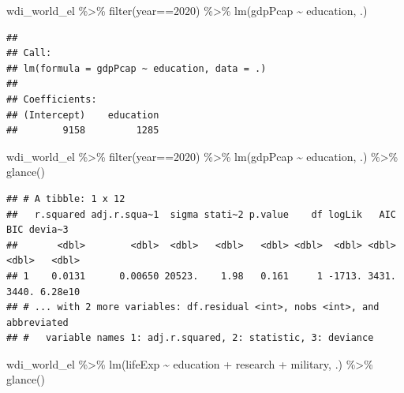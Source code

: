 \documentclass[
]{article}
\newenvironment{Shaded}{\begin{snugshade}}{\end{snugshade}}
\newcommand{\DecValTok}[1]{\textcolor[rgb]{0.00,0.00,0.81}{#1}}
\newcommand{\FunctionTok}[1]{\textcolor[rgb]{0.00,0.00,0.00}{#1}}
\newcommand{\NormalTok}[1]{#1}
\newcommand{\SpecialCharTok}[1]{\textcolor[rgb]{0.00,0.00,0.00}{#1}}
\begin{document}
\begin{Shaded}
\begin{Highlighting}[]
\NormalTok{wdi\_world\_el }\SpecialCharTok{\%\textgreater{}\%} \FunctionTok{filter}\NormalTok{(year}\SpecialCharTok{==}\DecValTok{2020}\NormalTok{) }\SpecialCharTok{\%\textgreater{}\%} \FunctionTok{lm}\NormalTok{(gdpPcap }\SpecialCharTok{\textasciitilde{}}\NormalTok{ education, .)}
\end{Highlighting}
\end{Shaded}

\begin{verbatim}
## 
## Call:
## lm(formula = gdpPcap ~ education, data = .)
## 
## Coefficients:
## (Intercept)    education  
##        9158         1285
\end{verbatim}

\begin{Shaded}
\begin{Highlighting}[]
\NormalTok{wdi\_world\_el }\SpecialCharTok{\%\textgreater{}\%} \FunctionTok{filter}\NormalTok{(year}\SpecialCharTok{==}\DecValTok{2020}\NormalTok{) }\SpecialCharTok{\%\textgreater{}\%} \FunctionTok{lm}\NormalTok{(gdpPcap }\SpecialCharTok{\textasciitilde{}}\NormalTok{ education, .) }\SpecialCharTok{\%\textgreater{}\%} \FunctionTok{glance}\NormalTok{()}
\end{Highlighting}
\end{Shaded}

\begin{verbatim}
## # A tibble: 1 x 12
##   r.squared adj.r.squa~1  sigma stati~2 p.value    df logLik   AIC   BIC devia~3
##       <dbl>        <dbl>  <dbl>   <dbl>   <dbl> <dbl>  <dbl> <dbl> <dbl>   <dbl>
## 1    0.0131      0.00650 20523.    1.98   0.161     1 -1713. 3431. 3440. 6.28e10
## # ... with 2 more variables: df.residual <int>, nobs <int>, and abbreviated
## #   variable names 1: adj.r.squared, 2: statistic, 3: deviance
\end{verbatim}

\begin{Shaded}
\begin{Highlighting}[]
\NormalTok{wdi\_world\_el }\SpecialCharTok{\%\textgreater{}\%} \FunctionTok{lm}\NormalTok{(lifeExp }\SpecialCharTok{\textasciitilde{}}\NormalTok{ education }\SpecialCharTok{+}\NormalTok{ research }\SpecialCharTok{+}\NormalTok{ military, .) }\SpecialCharTok{\%\textgreater{}\%} \FunctionTok{glance}\NormalTok{()}
\end{Highlighting}
\end{Shaded}
\end{document}
